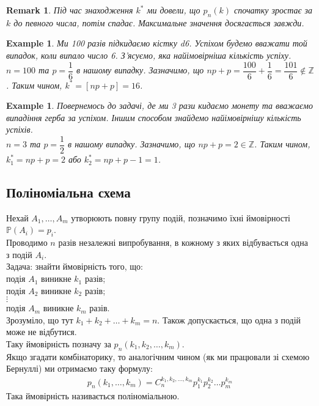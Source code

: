 \documentclass[a4paper, 10pt]{article}
\theoremstyle{theoremdd}
\newtheorem{example}[theorem]{Example}
\newtheorem{remark}[theorem]{Remark}
\begin{document}
\begin{remark}
Під час знаходження $k^*$ ми довели, що $p_n(k)$ спочатку зростає за $k$ до певного числа, потім спадає. Максимальне значення досягається завжди.
\end{remark}

\begin{example}
Ми 100 разів підкидаємо кістку d6. Успіхом будемо вважати той випадок, коли випало число 6. З'ясуємо, яка найімовірніша кількість успіху.\\
$n = 100$ та $p = \dfrac{1}{6}$ в нашому випадку. Зазначимо, що $np + p = \dfrac{100}{6} + \dfrac{1}{6} = \dfrac{101}{6} \notin \mathbb{Z}$. Таким чином, $k^* = [np+p] = 16$.
\end{example}

\begin{example}
Повернемось до задачі, де ми 3 рази кидаємо монету та вважаємо випадіння герба за успіхом. Іншим способом знайдемо найімовірнішу кількість успіхів.\\
$n = 3$ та $p = \dfrac{1}{2}$ в нашому випадку. Зазначимо, що $np + p = 2 \in \mathbb{Z}$. Таким чином, $k^*_1 = np+p = 2$ або $k^*_2 = np+p-1 = 1$.
\end{example}

\subsection{Поліноміальна схема}
Нехай $A_1,\dots,A_m$ утворюють повну групу подій, позначимо їхні ймовірності $\mathbb{P}(A_i) = p_i$.\\
Проводимо $n$ разів незалежні випробування, в кожному з яких відбувається одна з подій $A_i$. \\
Задача: знайти ймовірність того, що:\\
подія $A_1$ виникне $k_1$ разів;\\
подія $A_2$ виникне $k_2$ разів;\\
$\vdots$\\
подія $A_m$ виникне $k_m$ разів.\\
Зрозуміло, що тут $k_1 + k_2 + \dots + k_m = n$. Також допускається, що одна з подій може не відбутися.\\
Таку ймовірність позначу за $p_n(k_1,k_2,\dots,k_m)$.\\
Якщо згадати комбінаторику, то аналогічним чином (як ми працювали зі схемою Бернуллі) ми отримаємо таку формулу:
\begin{align*}
p_n(k_1,\dots,k_m) = C_n^{k_1,k_2,\dots,k_m} p_1^{k_1} p_2^{k_2} \dots p_m^{k_m}
\end{align*}
Така ймовірність називається поліноміальною.
\end{document}
